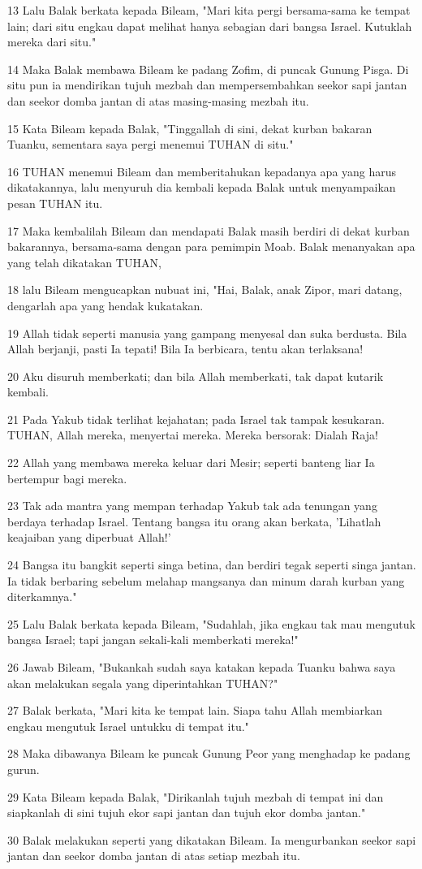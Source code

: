\par 13 Lalu Balak berkata kepada Bileam, "Mari kita pergi bersama-sama ke tempat lain; dari situ engkau dapat melihat hanya sebagian dari bangsa Israel. Kutuklah mereka dari situ."
\par 14 Maka Balak membawa Bileam ke padang Zofim, di puncak Gunung Pisga. Di situ pun ia mendirikan tujuh mezbah dan mempersembahkan seekor sapi jantan dan seekor domba jantan di atas masing-masing mezbah itu.
\par 15 Kata Bileam kepada Balak, "Tinggallah di sini, dekat kurban bakaran Tuanku, sementara saya pergi menemui TUHAN di situ."
\par 16 TUHAN menemui Bileam dan memberitahukan kepadanya apa yang harus dikatakannya, lalu menyuruh dia kembali kepada Balak untuk menyampaikan pesan TUHAN itu.
\par 17 Maka kembalilah Bileam dan mendapati Balak masih berdiri di dekat kurban bakarannya, bersama-sama dengan para pemimpin Moab. Balak menanyakan apa yang telah dikatakan TUHAN,
\par 18 lalu Bileam mengucapkan nubuat ini, "Hai, Balak, anak Zipor, mari datang, dengarlah apa yang hendak kukatakan.
\par 19 Allah tidak seperti manusia yang gampang menyesal dan suka berdusta. Bila Allah berjanji, pasti Ia tepati! Bila Ia berbicara, tentu akan terlaksana!
\par 20 Aku disuruh memberkati; dan bila Allah memberkati, tak dapat kutarik kembali.
\par 21 Pada Yakub tidak terlihat kejahatan; pada Israel tak tampak kesukaran. TUHAN, Allah mereka, menyertai mereka. Mereka bersorak: Dialah Raja!
\par 22 Allah yang membawa mereka keluar dari Mesir; seperti banteng liar Ia bertempur bagi mereka.
\par 23 Tak ada mantra yang mempan terhadap Yakub tak ada tenungan yang berdaya terhadap Israel. Tentang bangsa itu orang akan berkata, 'Lihatlah keajaiban yang diperbuat Allah!'
\par 24 Bangsa itu bangkit seperti singa betina, dan berdiri tegak seperti singa jantan. Ia tidak berbaring sebelum melahap mangsanya dan minum darah kurban yang diterkamnya."
\par 25 Lalu Balak berkata kepada Bileam, "Sudahlah, jika engkau tak mau mengutuk bangsa Israel; tapi jangan sekali-kali memberkati mereka!"
\par 26 Jawab Bileam, "Bukankah sudah saya katakan kepada Tuanku bahwa saya akan melakukan segala yang diperintahkan TUHAN?"
\par 27 Balak berkata, "Mari kita ke tempat lain. Siapa tahu Allah membiarkan engkau mengutuk Israel untukku di tempat itu."
\par 28 Maka dibawanya Bileam ke puncak Gunung Peor yang menghadap ke padang gurun.
\par 29 Kata Bileam kepada Balak, "Dirikanlah tujuh mezbah di tempat ini dan siapkanlah di sini tujuh ekor sapi jantan dan tujuh ekor domba jantan."
\par 30 Balak melakukan seperti yang dikatakan Bileam. Ia mengurbankan seekor sapi jantan dan seekor domba jantan di atas setiap mezbah itu.

